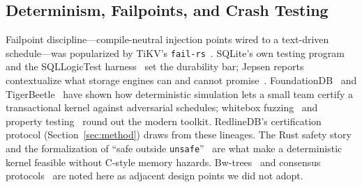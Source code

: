 \subsection{Determinism, Failpoints, and Crash Testing}
Failpoint discipline---compile-neutral injection points wired to a
text-driven schedule---was popularized by TiKV's
\texttt{fail-rs}~\cite{failrs}. SQLite's own testing
program~\cite{sqlite_testing} and the SQLLogicTest
harness~\cite{sqllogictest} set the durability bar; Jepsen reports
contextualize what storage engines can and cannot
promise~\cite{jepsen_sqlite}. FoundationDB~\cite{zhou2021foundationdb}
and TigerBeetle~\cite{tigerbeetle_sim} have shown how deterministic
simulation lets a small team certify a transactional kernel against
adversarial schedules; whitebox fuzzing~\cite{godefroid2008whitebox} and
property testing~\cite{proptest,claessen2000quickcheck} round out the
modern toolkit. RedlineDB's certification protocol
(Section~\ref{sec:method}) draws from these lineages. The Rust safety
story~\cite{klabnik2023rust,jung2021rustbelt} and the formalization of
``safe outside \texttt{unsafe}''~\cite{rust_unsafe_guidelines} are what
make a deterministic kernel feasible without C-style memory hazards.
Bw-trees~\cite{levandoski2013bwtree} and consensus
protocols~\cite{ongaro2014raft} are noted here as adjacent design
points we did not adopt.
